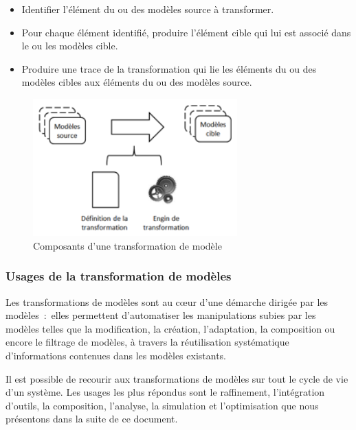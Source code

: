 \begin{itemize}
\item Identifier l'élément du ou des modèles source à transformer.
\item Pour chaque élément identifié, produire l'élément cible qui lui est 
associé dans le ou les modèles cible.
\item Produire une trace de la transformation qui lie les éléments du ou des 
modèles cibles aux éléments du ou des modèles source.
\end{itemize}

\begin{figure}[!htbp]
 \begin{center}
   \includegraphics[width=0.7\textwidth]{images/Chapitre1/composanttransfo.png}
 \end{center}
 \caption{Composants d'une transformation de modèle}
 \label{fig:composantTransfo}
\end{figure}

\subsubsection{Usages de la transformation de modèles }
Les transformations de modèles sont au cœur d'une démarche dirigée par les 
modèles~:~elles permettent d'automatiser les manipulations subies par les 
modèles telles que la modification, la création, l'adaptation, la composition ou 
encore le filtrage de modèles, à travers la réutilisation systématique 
d'informations contenues dans les modèles existants. 

Il est possible de recourir aux transformations de modèles sur tout le cycle de 
vie d'un système. Les usages les plus répondus sont le raffinement, 
l'intégration d'outils, la composition, l'analyse, la simulation et 
l'optimisation que nous présentons dans la suite de ce document. 

